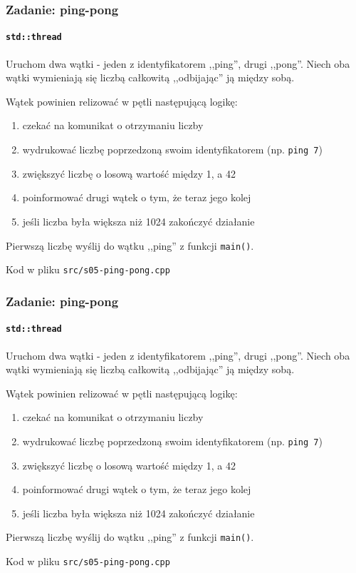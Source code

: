 \documentclass[aspectratio=169]{beamer}
\begin{document}
\begin{frame}[fragile]
    \frametitle{Zadanie: ping-pong}
    \framesubtitle{\texttt{std::thread}}
    \label{lecture_exercise_6}

    {\small
    Uruchom dwa wątki - jeden z identyfikatorem ,,ping'', drugi ,,pong''.
    Niech oba wątki wymieniają się liczbą całkowitą ,,odbijając'' ją między
    sobą.

    Wątek powinien relizować w pętli następującą logikę:
    \begin{enumerate}
        \item czekać na komunikat o otrzymaniu liczby
        \item wydrukować liczbę poprzedzoną swoim identyfikatorem (np.
            \texttt{ping 7})
        \item zwiększyć liczbę o losową wartość między 1, a 42
        \item poinformować drugi wątek o tym, że teraz jego kolej
        \item jeśli liczba była większa niż 1024 zakończyć działanie
    \end{enumerate}

    Pierwszą liczbę wyślij do wątku ,,ping'' z funkcji \texttt{main()}.

    \vspace{1em}

    Kod w pliku \texttt{src/s05-ping-pong.cpp}}
\end{frame}

\begin{frame}[fragile]
    \frametitle{Zadanie: ping-pong}
    \framesubtitle{\texttt{std::thread}}
    \label{lecture_exercise_6}

    {\small
    Uruchom dwa wątki - jeden z identyfikatorem ,,ping'', drugi ,,pong''.
    Niech oba wątki wymieniają się liczbą całkowitą ,,odbijając'' ją między
    sobą.

    Wątek powinien relizować w pętli następującą logikę:
    \begin{enumerate}
        \item czekać na komunikat o otrzymaniu liczby
        \item wydrukować liczbę poprzedzoną swoim identyfikatorem (np.
            \texttt{ping 7})
        \item zwiększyć liczbę o losową wartość między 1, a 42
        \item poinformować drugi wątek o tym, że teraz jego kolej
        \item jeśli liczba była większa niż 1024 zakończyć działanie
    \end{enumerate}

    Pierwszą liczbę wyślij do wątku ,,ping'' z funkcji \texttt{main()}.

    \vspace{1em}

    Kod w pliku \texttt{src/s05-ping-pong.cpp}}
\end{frame}
\end{document}
